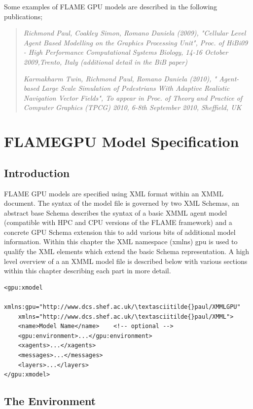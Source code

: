 \documentclass[11pt, a4paper, onecolumn, oneside]{report}
\begin{document}
Some examples of FLAME GPU models are described in the following publications;

\begin{quote}
\emph{Richmond Paul, Coakley Simon, Romano Daniela (2009), "Cellular Level Agent Based Modelling on the Graphics Processing Unit", Proc. of HiBi09 - High Performance Computational Systems Biology, 14-16 October 2009,Trento, Italy (additional detail in the BiB paper)}

\emph{Karmakharm Twin, Richmond Paul, Romano Daniela (2010), " Agent-based Large Scale Simulation of Pedestrians With Adaptive Realistic Navigation Vector Fields", To appear in Proc. of Theory and Practice of Computer Graphics (TPCG) 2010, 6-8th September 2010, Sheffield, UK}
\end{quote}


\chapter{FLAMEGPU Model Specification}
\label{ch:2}
\section{Introduction}
\label{sec:21}

FLAME GPU models are specified using XML format within an XMML document.
The syntax of the model file is governed by two XML Schemas, an abstract base Schema describes the syntax of a basic XMML agent model (compatible with HPC and CPU versions of the FLAME framework) and a concrete GPU Schema extension this to add various bits of additional model information.
Within this chapter the XML namespace (xmlns) gpu is used to qualify the XML elements which extend the basic Schema representation.
A high level overview of a an XMML model file is described below with various sections within this chapter describing each part in more detail.


\begin{verbatim}
<gpu:xmodel
    xmlns:gpu="http://www.dcs.shef.ac.uk/\textasciitilde{}paul/XMMLGPU"
    xmlns="http://www.dcs.shef.ac.uk/\textasciitilde{}paul/XMML">
    <name>Model Name</name>    <!-- optional -->
    <gpu:environment>...</gpu:environment>
    <xagents>...</xagents>
    <messages>...</messages>
    <layers>...</layers>
</gpu:xmodel>
\end{verbatim}

\section{The Environment}
\label{sec:22}
\end{document}
